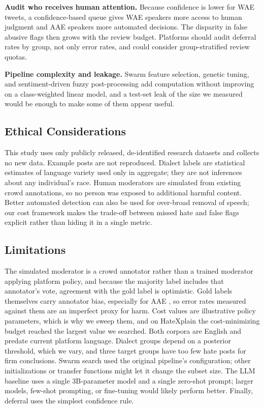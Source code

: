 \documentclass[lettersize,journal]{IEEEtran}
\begin{document}
\textbf{Audit who receives human attention.} Because confidence is lower for WAE tweets, a confidence-based queue gives WAE speakers more access to human judgment and AAE speakers more automated decisions. The disparity in false abusive flags then grows with the review budget. Platforms should audit deferral rates by group, not only error rates, and could consider group-stratified review quotas.

\textbf{Pipeline complexity and leakage.} Swarm feature selection, genetic tuning, and sentiment-driven fuzzy post-processing add computation without improving on a class-weighted linear model, and a test-set leak of the size we measured would be enough to make some of them appear useful.

\subsection{Ethical Considerations}
This study uses only publicly released, de-identified research datasets and collects no new data. Example posts are not reproduced. Dialect labels are statistical estimates of language variety used only in aggregate; they are not inferences about any individual's race. Human moderators are simulated from existing crowd annotations, so no person was exposed to additional harmful content. Better automated detection can also be used for over-broad removal of speech; our cost framework makes the trade-off between missed hate and false flags explicit rather than hiding it in a single metric.

\subsection{Limitations}
The simulated moderator is a crowd annotator rather than a trained moderator applying platform policy, and because the majority label includes that annotator's vote, agreement with the gold label is optimistic. Gold labels themselves carry annotator bias, especially for AAE \cite{sap2019risk}, so error rates measured against them are an imperfect proxy for harm. Cost values are illustrative policy parameters, which is why we sweep them, and on HateXplain the cost-minimizing budget reached the largest value we searched. Both corpora are English and predate current platform language. Dialect groups depend on a posterior threshold, which we vary, and three target groups have too few hate posts for firm conclusions. Swarm search used the original pipeline's configuration; other initializations or transfer functions might let it change the subset size. The LLM baseline uses a single 3B-parameter model and a single zero-shot prompt; larger models, few-shot prompting, or fine-tuning would likely perform better. Finally, deferral uses the simplest confidence rule.
\end{document}
